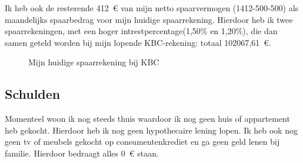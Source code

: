 %
%

Ik heb ook de resterende 412~\euro{} van mijn netto spaarvermogen (1412-500-500) als maandelijks spaarbedrag voor mijn huidige spaarrekening. 
Hierdoor heb ik twee spaarrekeningen, met een hoger intrestpercentage(1,50\% en 1,20\%), die dan samen geteld worden bij mijn lopende KBC-rekening: totaal 102067,61~\euro{}. 

\begin{figure}[!htbp]
	\centering
	\caption{Mijn huidige spaarrekening bij KBC}
	\label{fig:bedragsparenhuidigespaarrekening}
\end{figure}


\newpage
\subsection{Schulden}



Momenteel woon ik nog steeds thuis waardoor ik nog geen huis of appartement heb gekocht. Hierdoor heb ik nog geen hypothecaire lening lopen. Ik heb ook nog geen tv of meubels gekocht op consumentenkrediet en ga geen geld lenen bij familie. Hierdoor bedraagt alles 0~\euro{} staan.

